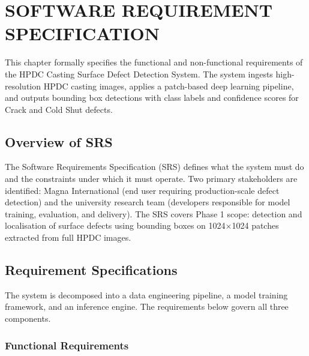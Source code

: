 \chapter{SOFTWARE REQUIREMENT SPECIFICATION}

\justify

This chapter formally specifies the functional and non-functional requirements of the HPDC Casting Surface Defect Detection System. The system ingests high-resolution HPDC casting images, applies a patch-based deep learning pipeline, and outputs bounding box detections with class labels and confidence scores for Crack and Cold Shut defects.

\section{Overview of SRS}
\justify

The Software Requirements Specification (SRS) defines what the system must do and the constraints under which it must operate. Two primary stakeholders are identified: Magna International (end user requiring production-scale defect detection) and the university research team (developers responsible for model training, evaluation, and delivery). The SRS covers Phase 1 scope: detection and localisation of surface defects using bounding boxes on 1024$\times$1024 patches extracted from full HPDC images.

\section{Requirement Specifications}
\justify

The system is decomposed into a data engineering pipeline, a model training framework, and an inference engine. The requirements below govern all three components.

\subsection{Functional Requirements}

